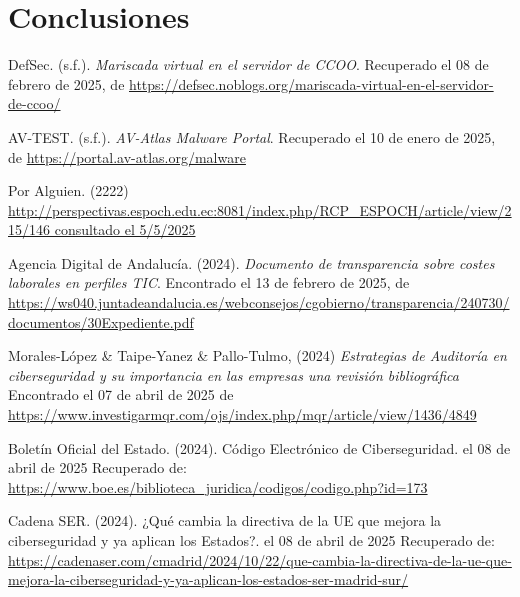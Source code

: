 \documentclass[a4paper, 10pt]{article}
\begin{document}
\clearpage

\section{Conclusiones}



\clearpage

\begin{thebibliography}{20}
    
    DefSec. (s.f.). \textit{Mariscada virtual en el servidor de CCOO}. Recuperado el 08 de febrero de 2025, de \url{https://defsec.noblogs.org/mariscada-virtual-en-el-servidor-de-ccoo/}
    
    AV-TEST. (s.f.). \textit{AV-Atlas Malware Portal}. Recuperado el 10 de enero de 2025, de \url{https://portal.av-atlas.org/malware}
    
    Por Alguien. (2222) \url{http://perspectivas.espoch.edu.ec:8081/index.php/RCP_ESPOCH/article/view/215/146 consultado el 5/5/2025}
    
    Agencia Digital de Andalucía. (2024). \textit{Documento de transparencia sobre costes laborales en perfiles TIC}. Encontrado el 13 de febrero de 2025, de \url{https://ws040.juntadeandalucia.es/webconsejos/cgobierno/transparencia/240730/documentos/30Expediente.pdf}
    
    Morales-López \& Taipe-Yanez \& Pallo-Tulmo, (2024) \textit{Estrategias de Auditoría en ciberseguridad y su importancia en las empresas una revisión bibliográfica} Encontrado el 07 de abril de 2025 de \url{https://www.investigarmqr.com/ojs/index.php/mqr/article/view/1436/4849}

    Boletín Oficial del Estado. (2024). Código Electrónico de Ciberseguridad. el 08 de abril de 2025 Recuperado de: \url{https://www.boe.es/biblioteca_juridica/codigos/codigo.php?id=173}

    Cadena SER. (2024). ¿Qué cambia la directiva de la UE que mejora la ciberseguridad y ya aplican los Estados?. el 08 de abril de 2025 Recuperado de: \url{https://cadenaser.com/cmadrid/2024/10/22/que-cambia-la-directiva-de-la-ue-que-mejora-la-ciberseguridad-y-ya-aplican-los-estados-ser-madrid-sur/}


\end{thebibliography}
\end{document}

